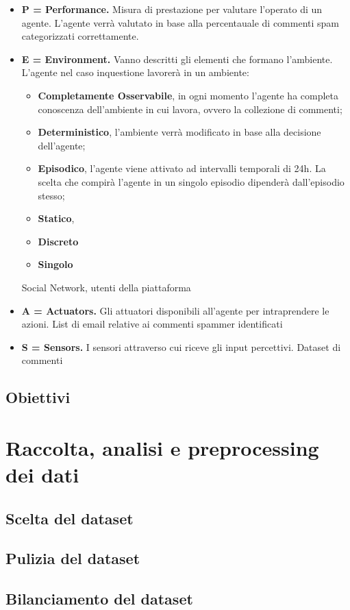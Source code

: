 \documentclass{article} %
\begin{document}
    \begin{itemize}
        \item 
        {\bfseries P = Performance.} Misura di prestazione per valutare l'operato di un agente.
        L'agente verrà valutato in base alla percentauale di commenti spam categorizzati correttamente.
        \item 
        {\bfseries E = Environment.} Vanno descritti gli elementi che formano l'ambiente.
        L'agente nel caso inquestione lavorerà in un ambiente:
            \begin{itemize}
                \item {\bfseries Completamente Osservabile}, in ogni momento l'agente ha completa conoscenza
                dell'ambiente in cui lavora, ovvero la collezione di commenti;
                \item {\bfseries Deterministico}, l'ambiente verrà modificato in base alla decisione dell'agente;
                \item {\bfseries Episodico}, l'agente viene attivato ad intervalli temporali di 24h. La scelta che
                compirà l'agente in un singolo episodio dipenderà dall'episodio stesso;
                \item {\bfseries Statico}, 
                \item {\bfseries Discreto}
                \item {\bfseries Singolo}
            \end{itemize}
          
        Social Network, utenti della piattaforma
        \item 
        {\bfseries A = Actuators.} Gli attuatori disponibili all'agente per intraprendere le azioni.
        List di email relative ai commenti spammer identificati
        \item 
        {\bfseries S = Sensors.} I sensori attraverso cui riceve gli input percettivi.
        Dataset di commenti


        
      \end{itemize}
    

    

                        


    \subsection{Obiettivi}
    \section{Raccolta, analisi e preprocessing dei dati}
    \subsection{Scelta del dataset}
    \subsection{Pulizia del dataset}
    \subsection{Bilanciamento del dataset}
\end{document}
